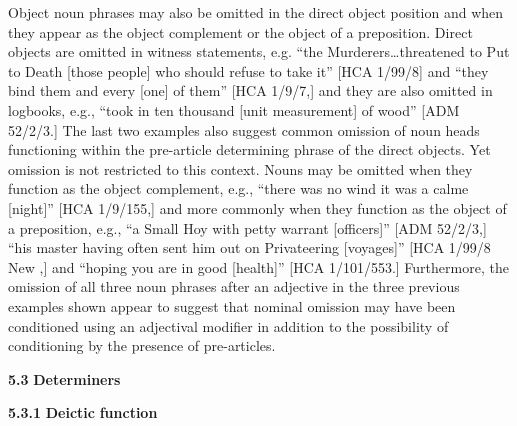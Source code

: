 Object noun phrases may also be omitted in the direct object position and when they appear as the object complement or the object of a preposition. Direct objects are omitted in witness statements, e.g. “the Murderers…threatened to Put to Death [those people] who should refuse to take it” [HCA 1/99/8] and “they bind them and every [one] of them” [HCA 1/9/7,] and they are also omitted in logbooks, e.g., “took in ten thousand [unit measurement] of wood” [ADM 52/2/3.] The last two examples also suggest common omission of noun heads functioning within the pre-article determining phrase of the direct objects. Yet omission is not restricted to this context. Nouns may be omitted when they function as the object complement, e.g., “there was no wind it was a calme [night]” [HCA 1/9/155,] and more commonly when they function as the object of a preposition, e.g., “a Small Hoy with petty warrant [officers]” [ADM 52/2/3,] “his master having often sent him out on Privateering [voyages]” [HCA 1/99/8 New \citealt{Providence1722},] and “hoping you are in good [health]” [HCA 1/101/553.] Furthermore, the omission of all three noun phrases after an adjective in the three previous examples shown appear to suggest that nominal omission may have been conditioned using an adjectival modifier in addition to the possibility of conditioning by the presence of pre-articles. 

\textbf{5.3} \textbf{Determiners}

\textbf{5.3.1} \textbf{Deictic} \textbf{function}


